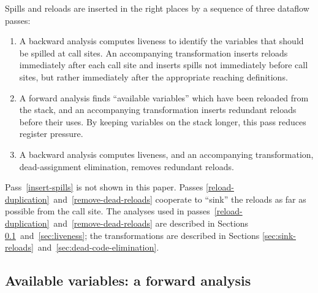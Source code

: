 \documentclass[blockstyle,preprint,natbib,nocopyrightspace]{sigplanconf}
\newcommand{\authornote}[1]{{\em #1}}
\def\authornote#1{\unskip\relax}
\newcommand{\simon}[1]{\authornote{SLPJ: #1}}
\newcommand\secreftwo[2]{Sections \ref{sec:#1}~and~\ref{sec:#2}}
\newcommand\seclabel[1]{\label{sec:#1}}
\begin{document}
Spills and reloads are inserted in the right places
by a sequence of three dataflow passes:
\begin{enumerate}
\item
\label{insert-spills}
A backward analysis computes liveness
to identify the variables that should be spilled at call sites.
An accompanying transformation inserts reloads immediately after each call
site and inserts spills not immediately before call sites, but
rather immediately after the appropriate reaching definitions.
\item
\label{reload-duplication}
A forward analysis finds ``available variables'' which have been reloaded
from the stack, and an accompanying transformation
inserts redundant reloads before their uses.
By keeping variables on the stack longer, this pass reduces register pressure.
\item
\label{remove-dead-reloads}
A backward analysis computes liveness,
and an accompanying transformation, dead-assignment elimination,
removes redundant reloads.
\end{enumerate}
Pass~\ref{insert-spills} is not shown in this paper.
Passes
\ref{reload-duplication}~and~\ref{remove-dead-reloads} cooperate to ``sink''
the reloads as far as possible from the call site.
The analyses used in
passes~\ref{reload-duplication}~and~\ref{remove-dead-reloads}
are described in \secreftwo{avail}{liveness};
the transformations are described in
\secreftwo{sink-reloads}{dead-code-elimination}.



\subsection{Available variables: a forward analysis} 

\seclabel{avail}
\end{document}
